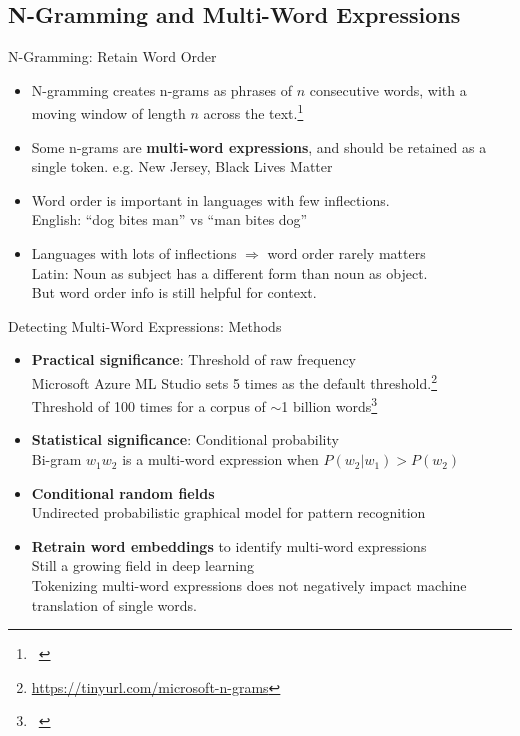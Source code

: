 \documentclass{beamer}
\renewcommand{\cite}{\citep}
\begin{document}
\subsection{N-Gramming and Multi-Word Expressions}

\begin{frame}{N-Gramming: Retain Word Order}
\begin{itemize}
\item N-gramming creates n-grams as phrases of $n$ consecutive words, with a moving window of length $n$ across the text.\footnote{~\cite{gries2010lexical}}
\item Some n-grams are \textbf{multi-word expressions}, and should be retained as a single token. e.g. New Jersey, Black Lives Matter
	\bigskip
\item Word order is important in languages with few inflections.\\
	English: ``dog bites man'' vs ``man bites dog''~\cite{haspelmath1996word}
\item Languages with lots of inflections $\Rightarrow$ word order rarely matters\\
	Latin: Noun as subject has a different form than noun as object.\\
	But word order info is still helpful for context.~\cite{beier2011exploiting}
\end{itemize}
\end{frame}

\begin{frame}{Detecting Multi-Word Expressions: Methods}
\begin{itemize}
\item \textbf{Practical significance}: Threshold of raw frequency\\
Microsoft Azure ML Studio sets 5 times as the default threshold.\footnote{\url{https://tinyurl.com/microsoft-n-grams}}\\
Threshold of 100 times for a corpus of $\sim$1 billion words\footnote{~\cite{berberich2013computing}}
\item \textbf{Statistical significance}: Conditional probability~\cite{chai2017phdthesis}\\
Bi-gram $w_1 w_2$ is a multi-word expression when $P(w_2 | w_1) > P(w_2)$
	\bigskip
\item \textbf{Conditional random fields}{\footnotesize~\cite{lafferty2001conditional, maldonado2017detection}}\\
	Undirected probabilistic graphical model for pattern recognition
\item \textbf{Retrain word embeddings} to identify multi-word expressions\\
	Still a growing field in deep learning~\cite{ashok2019comparing}\\
	Tokenizing multi-word expressions does not negatively impact machine translation of single words.~\cite{otani2020pre}
\end{itemize}
\end{frame}
\end{document}

